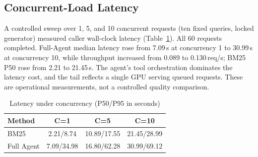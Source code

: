 \documentclass[conference]{IEEEtran}
\begin{document}
\subsection{Concurrent-Load Latency}
A controlled sweep over 1, 5, and 10 concurrent requests (ten fixed queries, locked generator) measured caller wall-clock latency (Table~\ref{tab:load}). All 60 requests completed. Full-Agent median latency rose from 7.09\,s at concurrency 1 to 30.99\,s at concurrency 10, while throughput increased from 0.089 to 0.130\,req/s; BM25 P50 rose from 2.21 to 21.45\,s. The agent's tool orchestration dominates the latency cost, and the tail reflects a single GPU serving queued requests. These are operational measurements, not a controlled quality comparison.
\begin{table}[t]
\caption{Latency under concurrency (P50/P95 in seconds)}
\label{tab:load}
\centering\scriptsize\setlength{\tabcolsep}{3pt}
\begin{tabular*}{\columnwidth}{@{\extracolsep{\fill}}lccc@{}}
\toprule
Method & C=1 & C=5 & C=10 \\
\midrule
BM25 & 2.21/8.74 & 10.89/17.55 & 21.45/28.99 \\
Full Agent & 7.09/34.98 & 16.80/62.28 & 30.99/69.12 \\
\bottomrule
\end{tabular*}
\end{table}
\end{document}
